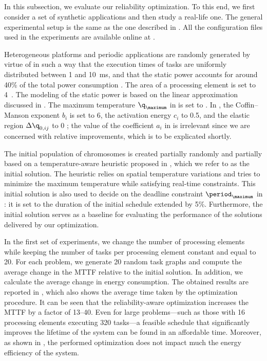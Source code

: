 \subsection{\resultstitle}

In this subsection, we evaluate our reliability optimization. To this end, we
first consider a set of synthetic applications and then study a real-life one.
The general experimental setup is the same as the one described in
. All the configuration files used in the
experiments are available online at \cite{eslab2012}.

Heterogeneous platforms and periodic applications are randomly generated by
virtue of  \cite{dick1998} in such a way that the execution times of
tasks are uniformly distributed between 1 and 10~ms, and that the static power
accounts for around 40\% of the total power consumption \cite{liu2007}. The area
of a processing element is set to 4~. The modeling of the static
power is based on the linear approximation discussed in
. The maximum temperature $\q_\maximum$ in
 is set to . In
, the Coffin--Manson exponent $b_i$ is set to
6, the activation energy $c_i$ to 0.5, and the elastic region $\Delta \q_{0,
ij}$ to 0 \cite{jedec2016}; the value of the coefficient $a_i$ in
 is irrelevant since we are concerned with
relative improvements, which is to be explicated shortly.

The initial population of chromosomes is created partially randomly and
partially based on a temperature-aware heuristic proposed in \cite{xie2006},
which we refer to as the initial solution. The heuristic relies on spatial
temperature variations and tries to minimize the maximum temperature while
satisfying real-time constraints. This initial solution is also used to decide
on the deadline constraint $\period_\maximum$ in
: it is set to the duration of the initial
schedule extended by 5\%. Furthermore, the initial solution serves as a baseline
for evaluating the performance of the solutions delivered by our optimization.

In the first set of experiments, we change the number of processing elements \np
while keeping the number of tasks \nt per processing element constant and equal
to 20. For each problem, we generate 20 random task graphs and compute the
average change in the \ac{MTTF} relative to the initial solution. In addition,
we calculate the average change in energy consumption. The obtained results are
reported in , which also shows the average
time taken by the optimization procedure. It can be seen that the
reliability-aware optimization increases the \ac{MTTF} by a factor of 13--40.
Even for large problems---such as those with 16 processing elements executing
320 tasks---a feasible schedule that significantly improves the lifetime of the
system can be found in an affordable time. Moreover, as shown in
, the performed optimization does not impact
much the energy efficiency of the system.

